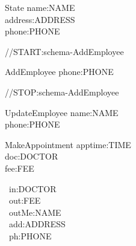 \documentclass[10pt]{article}
\begin{document}
\begin{schema}{State}
     name:NAME                                                                                      \\
     address:ADDRESS                                                                                \\
     phone:PHONE                                                                                    \\
\end{schema}

//START:schema-AddEmployee
\begin{schema}{AddEmployee}
     phone:PHONE                                                                                    \\
\end{schema}

//STOP:schema-AddEmployee


\begin{schema}{UpdateEmployee}
     name:NAME                                                                                      \\
     phone:PHONE                                                                                    \\
\end{schema}


\begin{schema}{MakeAppointment}
     apptime:TIME                                                                                   \\
     doc:DOCTOR                                                                                     \\
     fee:FEE                                                                                        \\
\end{schema}

\begin{circus}
\circchannel\ in:DOCTOR                                                                             \\
\circchannel\ out:FEE                                                                               \\
\circchannel\ outMe:NAME                                                                            \\
\circchannel\ add:ADDRESS                                                                           \\
\circchannel\ ph:PHONE                                                                              \\
\end{circus}
\end{document}
